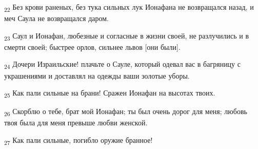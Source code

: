 \begin{tcolorbox}
\textsubscript{22} Без крови раненых, без тука сильных лук Ионафана не возвращался назад, и меч Саула не возвращался даром.
\end{tcolorbox}
\begin{tcolorbox}
\textsubscript{23} Саул и Ионафан, любезные и согласные в жизни своей, не разлучились и в смерти своей; быстрее орлов, сильнее львов [они были].
\end{tcolorbox}
\begin{tcolorbox}
\textsubscript{24} Дочери Израильские! плачьте о Сауле, который одевал вас в багряницу с украшениями и доставлял на одежды ваши золотые уборы.
\end{tcolorbox}
\begin{tcolorbox}
\textsubscript{25} Как пали сильные на брани! Сражен Ионафан на высотах твоих.
\end{tcolorbox}
\begin{tcolorbox}
\textsubscript{26} Скорблю о тебе, брат мой Ионафан; ты был очень дорог для меня; любовь твоя была для меня превыше любви женской.
\end{tcolorbox}
\begin{tcolorbox}
\textsubscript{27} Как пали сильные, погибло оружие бранное!
\end{tcolorbox}
